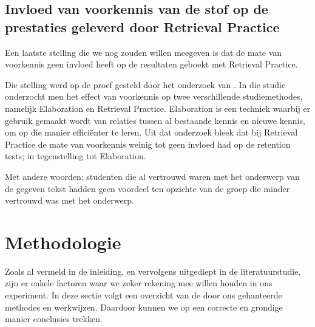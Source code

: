 \documentclass{hogent-article}
\begin{document}
\subsection{Invloed van voorkennis van de stof op de prestaties geleverd door Retrieval Practice}
\label{voorkennis}
Een laatste stelling die we nog zouden willen meegeven is dat de mate van voorkennis geen invloed heeft op de resultaten geboekt met Retrieval Practice.\\
\par
\noindent
Die stelling werd op de proef gesteld door het onderzoek van \textcite{Xiaofeng_2016}. In die studie onderzocht men het effect van voorkennis op twee verschillende studiemethodes, namelijk Elaboration en Retrieval Practice. Elaboration is een techniek waarbij er gebruik gemaakt wordt van relaties tussen al bestaande kennis en nieuwe kennis, om op die manier efficiënter te leren. Uit dat onderzoek bleek dat bij Retrieval Practice de mate van voorkennis weinig tot geen invloed had op de retention tests; in tegenstelling tot Elaboration.\\
\par
\noindent
Met andere woorden: studenten die al vertrouwd waren met het onderwerp van de gegeven tekst hadden geen voordeel ten opzichte van de groep die minder vertrouwd was met het onderwerp.


\section{Methodologie}
\label{methodologie}
Zoals al vermeld in de inleiding, en vervolgens uitgediept in de literatuurstudie, zijn er enkele factoren waar we zeker rekening mee willen houden in ons experiment. In deze sectie volgt een overzicht van de door ons gehanteerde methodes en werkwijzen. Daardoor kunnen we op een correcte en grondige manier conclusies trekken.
\end{document}
